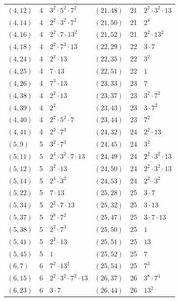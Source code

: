 \documentclass[11pt]{article}
\begin{document}
\begin{longtable}{@{}lrl@{\qquad}lrl@{}}
$(4,12)$ & 4 & $3^{2}\cdot 5^{2}\cdot 7^{2}$ & $(21,48)$ & 21 & $2^{2}\cdot 3^{2}\cdot 13$\\
$(4,14)$ & 4 & $2^{2}\cdot 3^{2}\cdot 7^{2}$ & $(21,50)$ & 21 & $2^{4}$\\
$(4,16)$ & 4 & $2^{2}\cdot 7\cdot 13^{2}$ & $(21,52)$ & 21 & $2^{2}\cdot 13^{2}$\\
$(4,18)$ & 4 & $2^{2}\cdot 7^{3}\cdot 13$ & $(22,29)$ & 22 & $3\cdot 7$\\
$(4,24)$ & 4 & $2^{2}\cdot 13$ & $(22,35)$ & 22 & $3^{2}$\\
$(4,25)$ & 4 & $7\cdot 13$ & $(22,51)$ & 22 & $1$\\
$(4,26)$ & 4 & $7^{3}\cdot 13$ & $(23,33)$ & 23 & $7$\\
$(4,38)$ & 4 & $2^{2}\cdot 13$ & $(23,37)$ & 23 & $3^{2}\cdot 7^{2}$\\
$(4,39)$ & 4 & $2^{2}$ & $(23,43)$ & 23 & $3\cdot 7^{2}$\\
$(4,40)$ & 4 & $2^{2}\cdot 5^{2}\cdot 7$ & $(23,44)$ & 23 & $7^{2}$\\
$(4,41)$ & 4 & $2^{2}\cdot 7^{3}$ & $(24,32)$ & 24 & $2^{2}\cdot 13$\\
$(5,9)$ & 5 & $3^{2}\cdot 7^{3}$ & $(24,45)$ & 24 & $3^{2}$\\
$(5,11)$ & 5 & $2^{4}\cdot 3^{2}\cdot 7\cdot 13$ & $(24,49)$ & 24 & $2^{2}\cdot 3^{2}\cdot 13$\\
$(5,12)$ & 5 & $3^{2}\cdot 13$ & $(24,50)$ & 24 & $2^{2}\cdot 3^{2}\cdot 13$\\
$(5,14)$ & 5 & $2^{4}\cdot 3^{2}$ & $(24,53)$ & 24 & $2^{2}\cdot 3^{2}$\\
$(5,22)$ & 5 & $7\cdot 13$ & $(25,28)$ & 25 & $3\cdot 7$\\
$(5,34)$ & 5 & $2^{2}\cdot 7\cdot 13$ & $(25,32)$ & 25 & $3\cdot 13$\\
$(5,37)$ & 5 & $2^{8}\cdot 7^{2}$ & $(25,47)$ & 25 & $3\cdot 7\cdot 13$\\
$(5,38)$ & 5 & $2^{2}\cdot 7^{3}$ & $(25,50)$ & 25 & $1$\\
$(5,41)$ & 5 & $2^{2}\cdot 13$ & $(25,51)$ & 25 & $13$\\
$(5,45)$ & 5 & $1$ & $(25,52)$ & 25 & $7$\\
$(6,7)$ & 6 & $7^{2}\cdot 13^{2}$ & $(25,54)$ & 25 & $7^{3}$\\
$(6,15)$ & 6 & $2^{2}\cdot 3^{2}\cdot 7^{2}\cdot 13$ & $(26,37)$ & 26 & $3^{8}\cdot 7^{4}$\\
$(6,23)$ & 6 & $3\cdot 7$ & $(26,44)$ & 26 & $13^{2}$\\

\end{longtable}
\end{document}
